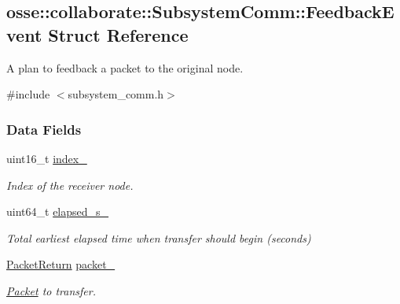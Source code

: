 \hypertarget{structosse_1_1collaborate_1_1_subsystem_comm_1_1_feedback_event}{}\subsection{osse\+:\+:collaborate\+:\+:Subsystem\+Comm\+:\+:Feedback\+Event Struct Reference}
\label{structosse_1_1collaborate_1_1_subsystem_comm_1_1_feedback_event}


A plan to feedback a packet to the original node.  




{\ttfamily \#include $<$subsystem\+\_\+comm.\+h$>$}

\subsubsection*{Data Fields}
\begin{DoxyCompactItemize}
\item 
\mbox{\label{structosse_1_1collaborate_1_1_subsystem_comm_1_1_feedback_event_af116edadaf008d7c05ab0effcd13bb65}} 
uint16\+\_\+t \hyperlink{structosse_1_1collaborate_1_1_subsystem_comm_1_1_feedback_event_af116edadaf008d7c05ab0effcd13bb65}{index\+\_\+}
\begin{DoxyCompactList}\small\item\em Index of the receiver node. \end{DoxyCompactList}\item 
\mbox{\label{structosse_1_1collaborate_1_1_subsystem_comm_1_1_feedback_event_a6bdb809d39809ec7b7db279b1e0a9328}} 
uint64\+\_\+t \hyperlink{structosse_1_1collaborate_1_1_subsystem_comm_1_1_feedback_event_a6bdb809d39809ec7b7db279b1e0a9328}{elapsed\+\_\+s\+\_\+}
\begin{DoxyCompactList}\small\item\em Total earliest elapsed time when transfer should begin (seconds) \end{DoxyCompactList}\item 
\mbox{\label{structosse_1_1collaborate_1_1_subsystem_comm_1_1_feedback_event_ab124adecbe5f57978cca26aeafbd23d8}} 
\hyperlink{classosse_1_1collaborate_1_1_packet_return}{Packet\+Return} \hyperlink{structosse_1_1collaborate_1_1_subsystem_comm_1_1_feedback_event_ab124adecbe5f57978cca26aeafbd23d8}{packet\+\_\+}
\begin{DoxyCompactList}\small\item\em \hyperlink{classosse_1_1collaborate_1_1_packet}{Packet} to transfer. \end{DoxyCompactList}\end{DoxyCompactItemize}


